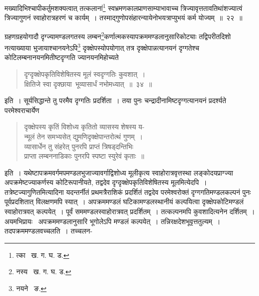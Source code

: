 \documentclass[11pt, openany]{book}
\begin{document}
\newpage

\noindent मख्यादिभिश्चापीकर्तुमशक्यत्वात् तत्कलानां\renewcommand{\thefootnote}{१}\footnote{त्का \textendash\ ख. ग. घ. ड.} स्वभ्रमणकालप्राणसाम्याभावाच्च त्रिज्यावृत्ततावतिथांशज्यात्वं त्रिज्यागुणनं स्वाहोरात्रहरणं च कार्यम्~। तस्माद्गुणोपसंहारन्यायेनोभयत्राप्युभयं कर्म योज्यम्~॥~२२~॥\\
\begin{sloppypar} 	
\indent ग्रहणग्रहयोगादौ दृग्ज्यामण्डलगतस्य लम्बन\renewcommand{\thefootnote}{२}\footnote{नस्य \textendash\ ख. ग. घ. ड.}कर्णात्मकस्यापक्रममण्डलानुसारिकोट्याः तद्विपरीतदिशो नत्याख्याया भुजायाश्चानयनेऽपि\renewcommand{\thefootnote}{३}\footnote{नयने \textendash\ ङ.} दृक्क्षेपस्योपयोगात् तत्र दृक्क्षेपान्नत्यानयनं दृग्गतेश्च कोटिलम्बनानयनमितीष्टदृग्गति ज्यानयनमिहोच्यते\textendash 
\end{sloppypar}

\begin{quote}
{\ab दृग्दृक्क्षेपकृतिविशेषितस्य मूलं स्वदृग्गतिः कुवशात्~।\\
क्षितिजे स्वा दृक्छाया~भूव्यासार्धं नभोमध्यात्~॥~३४~॥}
\end{quote}
 
इति~। सूर्यसिद्धान्ते तु परमैव दृग्गतिः प्रदर्शिता~। तया पुनः चन्द्रादीनामिष्टदृग्गत्यानयनं प्रदर्श्यते परमेश्वराचार्येण\textendash  

\begin{quote} 
{\qt दृक्क्षेपस्य कृतिं विशोध्य कृतितो व्यासस्य शेषस्य य-\\
न्मूलं तेन समभ्यसेत् द्युमणिदृक्क्षेपान्तरोत्थं गुणम्~।\\
व्यासार्धेन तु संहरेत् पुनरपि प्राप्तं त्रिषड्दन्तिभिः\\
प्राप्ता लम्बननाडिकाः पुनरपि स्पष्टा स्युरेवं कृताः~॥}
\end{quote} 

\noindent इति~। यथेष्टापक्रमवर्गमपमण्डलभुजाज्यावर्गाद्विशोध्य मूलीकृत्य स्वाहोरात्रवृत्तस्था लङ्कोदयप्राग्ज्या अपक्रमेष्टज्याकर्णस्य कोटिरूपानीयते, तद्वदेव दृग्दृक्क्षेपकृतिविशेषितस्य मूलमित्येदपि~। तत्रेष्टज्यागुणितमित्यादिना यदन्तर्नीतं प्रथमत्रैराशिकं  प्रदर्शितं तद्वदेव परमेश्वरोक्तं दृग्गगतिमण्डलकल्पनं पुनः पूर्वप्रदशितात् विलक्षणमपि स्यात्~। अपक्रममण्डलं घटिकामण्डलस्थानीयं कल्पयित्वा दृक्क्षेपकोटिमण्डलं स्वाहोरात्रवत् कल्पयेत्~। पूर्वं सममण्डलस्वाहोरात्रवत् प्रदर्शितम्~। तत्कल्पनमपि कुवशादित्यनेन दर्शितम्~। अयमभिप्रायः \textendash\ अपक्रममण्डलानुसारि भूगोलेऽपि मण्डलं कल्पयेत्~। तन्निरक्षदेशभूवृत्ततुल्यम्~। तदपक्रममण्डलवच्चलति~। तच्चलन-

\newpage
\end{document}
